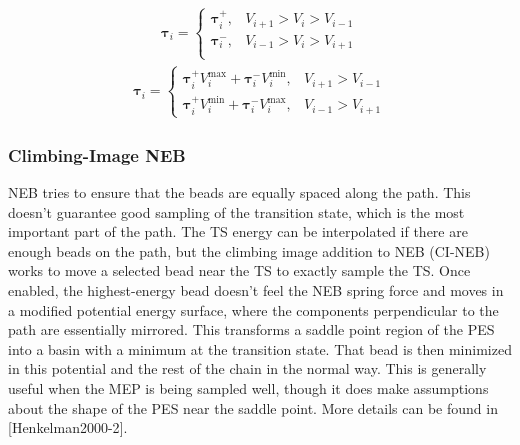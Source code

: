 \documentclass[letterpaper,10pt,english]{sphinxmanual}
\begin{document}
\label{\detokenize{nudged-elastic-band:equation-improved-tangent-1}}\begin{equation}\label{equation:nudged-elastic-band:improved_tangent_1}
\begin{split}\boldsymbol{\tau}_i=
\begin{cases}
\boldsymbol{\tau}_i^+, & V_{i+1} > V_i > V_{i-1} \\
\boldsymbol{\tau}_i^-, & V_{i-1} > V_i > V_{i+1} \\
\end{cases}\end{split}
\end{equation}\label{\detokenize{nudged-elastic-band:equation-improved-tangent-2}}\begin{equation}\label{equation:nudged-elastic-band:improved_tangent_2}
\begin{split}\boldsymbol{\tau}_i=
\begin{cases}
\boldsymbol{\tau}_i^+ V_i^\mathrm{max} + \boldsymbol{\tau}_i^- V_i^\mathrm{min}, & V_{i+1} > V_{i-1} \\
\boldsymbol{\tau}_i^+ V_i^\mathrm{min} + \boldsymbol{\tau}_i^- V_i^\mathrm{max}, & V_{i-1} > V_{i+1}
\end{cases}\end{split}
\end{equation}

\subsubsection{Climbing-Image NEB}
\label{\detokenize{nudged-elastic-band:climbing-image-neb}}
NEB tries to ensure that the beads are equally spaced along the path.
This doesn’t guarantee good sampling of the transition state, which is
the most important part of the path. The TS energy can be interpolated
if there are enough beads on the path, but the climbing image addition
to NEB (CI-NEB) works to move a selected bead near the TS to exactly
sample the TS. Once enabled, the highest-energy bead doesn’t feel the
NEB spring force and moves in a modified potential energy surface, where
the components perpendicular to the path are essentially mirrored. This
transforms a saddle point region of the PES into a basin with a minimum
at the transition state. That bead is then minimized in this potential
and the rest of the chain in the normal way. This is generally useful
when the MEP is being sampled well, though it does make assumptions
about the shape of the PES near the saddle point. More details can be
found in {[}Henkelman2000-2{]}.
\end{document}
